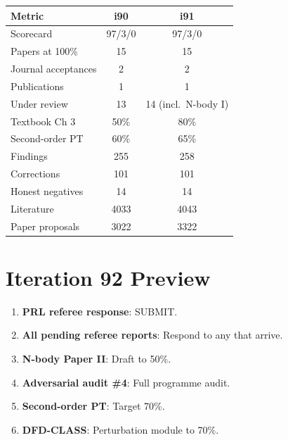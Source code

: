 \documentclass[11pt,a4paper]{article}
\begin{document}
\begin{center}
\begin{tabular}{lcc}
\toprule
\textbf{Metric} & \textbf{i90} & \textbf{i91} \\
\midrule
Scorecard & 97/3/0 & 97/3/0 \\
Papers at 100\% & 15 & 15 \\
Journal acceptances & 2 & 2 \\
Publications & 1 & 1 \\
Under review & 13 & 14 (incl.\ N-body I) \\
Textbook Ch 3 & 50\% & 80\% \\
Second-order PT & 60\% & 65\% \\
Findings & 255 & 258 \\
Corrections & 101 & 101 \\
Honest negatives & 14 & 14 \\
Literature & 4033 & 4043 \\
Paper proposals & 3022 & 3322 \\
\bottomrule
\end{tabular}
\end{center}

\section{Iteration 92 Preview}

\begin{tcolorbox}[colback=blue!5!white, colframe=dfdblue, title=\textbf{i92 Targets}]
\begin{enumerate}[nosep]
\item \textbf{PRL referee response}: SUBMIT.
\item \textbf{All pending referee reports}: Respond to any that arrive.
\item \textbf{N-body Paper II}: Draft to 50\%.
\item \textbf{Adversarial audit \#4}: Full programme audit.
\item \textbf{Second-order PT}: Target 70\%.
\item \textbf{DFD-CLASS}: Perturbation module to 70\%.
\end{enumerate}
\end{tcolorbox}

\end{document}
